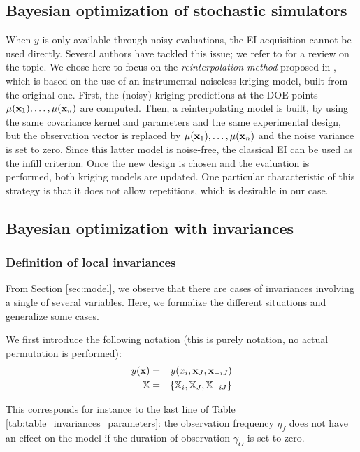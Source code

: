 \subsection{Bayesian optimization of stochastic simulators}
When $y$ is only available through noisy evaluations, the EI acquisition cannot be used directly.
Several authors have tackled this issue; we refer to \cite{picheny2013benchmark} for a review on the topic.
We chose here to focus on the \textit{reinterpolation method} proposed in \cite{forrester2006design}, which is based on the use of an instrumental noiseless kriging model, 
built from the original one. First, the (noisy) kriging predictions at the DOE points $\mu(\mathbf{x}_1), \ldots, \mu(\mathbf{x}_n)$ are computed. 
Then, a reinterpolating model is built, by using the same covariance kernel and parameters and the same experimental design, but
the observation vector is replaced by $\mu(\mathbf{x}_1), \ldots, \mu(\mathbf{x}_n)$ and the noise variance is set to zero. Since this latter model is
noise-free, the classical EI can be used as the infill criterion. Once the new design is chosen and the evaluation is performed,
both kriging models are updated. One particular characteristic of this strategy is that it does not allow repetitions, which is desirable in our
case.

\subsection{Bayesian optimization with invariances}

\subsubsection{Definition of local invariances}
From Section \ref{sec:model}, we observe that there are cases of invariances involving a single of several variables. 
Here, we formalize the different situations and generalize some cases.

We first introduce the following notation (this is purely notation, no actual permutation is performed):
\begin{eqnarray}
 y(\mathbf{x}) &=& y(x_i, \mathbf{x}_J, \mathbf{x}_{-iJ})\\
 \mathbb{X} &=& \{\mathbb{X}_i, \mathbb{X}_J, \mathbb{X}_{-iJ} \}
\end{eqnarray}

This corresponds for instance to the last line of Table \ref{tab:table_invariances_parameters}: the observation frequency $\eta_f$ does not have an effect on the model if the duration of observation $\gamma_O$ is set to zero.

